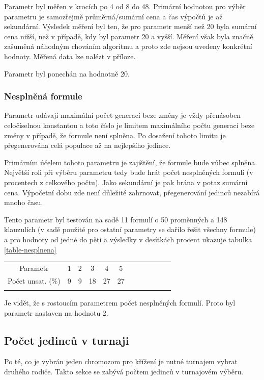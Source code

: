 \documentclass[a4paper]{article}
\begin{document}
			Parametr byl měřen v krocích po 4 od 8 do 48. Primární hodnotou pro výběr parametru je samozřejmě průměrná/sumární cena a čas výpočtů je až sekundární. Výsledek měření byl ten, že  pro parametr menší než 20 byla sumární cena nižší, než v případě, kdy byl parametr 20 a vyšší. Měření však byla značně zašuměná náhodným chováním algoritmu a proto zde nejsou uvedeny konkrétní hodnoty. Měřená data lze nalézt v příloze.
			
			Parametr byl ponechán na hodnotně 20.

		\subsubsection{Nesplněná formule}
			Parametr udávají maximální počet generací beze změny je vždy přenásoben celočíselnou konstantou a toto číslo je limitem maximálního počtu generací beze změny v případě, že formule není splněna. Po dosažení tohoto limitu je přegenerována celá populace až na nejlepšího jedince.
			
			Primárním účelem tohoto parametru je zajištění, že formule bude vůbec splněna. Největší roli při výběru parametru tedy bude hrát počet nesplněných formulí (v procentech z celkového počtu). Jako sekundární je pak brána v potaz sumární cena. Výpočetní dobu zde není důležité zahrnovat, přegenerování jedinců nezabírá mnoho času.
			
			Tento parametr byl testován na sadě 11 formulí o 50 proměnných a 148 klauzulích (v sadě použité pro ostatní parametry se dařilo řešit všechny formule) a pro hodnoty od jedné do pěti a výsledky v desítkách procent ukazuje tabulka \ref{table-nesplnena}
			
			\begin{tabular}{cccccccccccc} \label{table-nesplnena}
			\\
			Parametr & 1 & 2 & 3 & 4 & 5 \\
			Počet unsat. ($\%$) & 9 & 9 & 18 & 27 & 27\\
			\\
			\end{tabular}
			
			Je vidět, že s rostoucím parametrem počet nesplněných formulí. Proto byl parametr nastaven na hodnotu 2.
		
	\subsection{Počet jedinců v turnaji}
		Po té, co je vybrán jeden chromozom pro křížení je nutné turnajem vybrat druhého rodiče. Takto sekce se zabývá počtem jedinců v turnajovém výběru.
		
\end{document}

